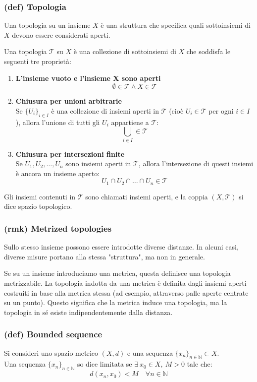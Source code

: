 \subsubsection{(def) Topologia}
Una topologia su un insieme $X$ è una struttura che specifica quali sottoinsiemi di $X$ devono essere considerati aperti.

Una topologia $\mathcal T$ su $X$ è una collezione di sottoinsiemi di $X$ che soddisfa le seguenti tre proprietà:
\begin{enumerate}[label=\roman*]
    \item \textbf{L'insieme vuoto e l'insieme X sono aperti}\\
    $$\emptyset \in \mathcal T \land X\in \mathcal T$$
    \item \textbf{Chiusura per unioni arbitrarie}\\
    Se $\{U_i\}_{i\in I}$ è una collezione di insiemi aperti in $\mathcal T$ (cioè $U_i\in \mathcal T$ per ogni $i\in I$), allora l'unione di tutti gli $U_i$ appartiene a $\mathcal T$:
    $$\bigcup_{i\in I}\in \mathcal T$$
    \item \textbf{Chiusura per intersezioni finite}\\
    Se $U_1,U_2,\dots, U_n$ sono insiemi aperti in $\mathcal T$, allora l'intersezione di questi insiemi è ancora un insieme aperto:
    $$U_1\cap U_2\cap \dots \cap U_n\in \mathcal T$$
\end{enumerate}
Gli insiemi contenuti in $\mathcal T$ sono chiamati insiemi aperti, e la coppia $(X,\mathcal T)$ si dice spazio topologico.

\subsubsection{(rmk) Metrized topologies}
Sullo stesso insieme possono essere introdotte diverse distanze. In alcuni casi, diverse misure portano alla stessa "struttura", ma non in generale.

Se su un insieme introduciamo una metrica, questa definisce una topologia metrizzabile. La topologia indotta da una metrica è definita dagli insiemi aperti costruiti in base alla metrica stessa (ad esempio, attraverso palle aperte centrate su un punto). Questo significa che la metrica induce una topologia, ma la topologia in sé esiste indipendentemente dalla distanza.

\subsubsection{(def) Bounded sequence}
Si consideri uno spazio metrico $(X,d)$ e una sequenza $\{x_n\}_{n\in \mathbb N}\subset X$.\\
Una sequenza $\{x_n\}_{n\in \mathbb N}$ so dice limitata se $\exists\ x_0\in X,\ M>0$ tale che:
$$d(x_n,x_0)<M\quad \forall n\in \mathbb N$$
